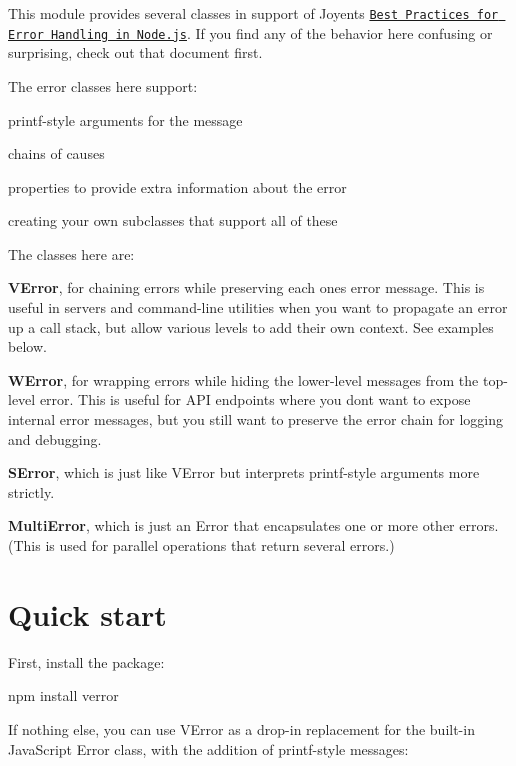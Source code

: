 This module provides several classes in support of Joyent\textquotesingle{}s \href{http://www.joyent.com/developers/node/design/errors}{\tt Best Practices for Error Handling in Node.\+js}. If you find any of the behavior here confusing or surprising, check out that document first.

The error classes here support\+:


\begin{DoxyItemize}
\item printf-\/style arguments for the message
\item chains of causes
\item properties to provide extra information about the error
\item creating your own subclasses that support all of these
\end{DoxyItemize}

The classes here are\+:


\begin{DoxyItemize}
\item {\bfseries V\+Error}, for chaining errors while preserving each one\textquotesingle{}s error message. This is useful in servers and command-\/line utilities when you want to propagate an error up a call stack, but allow various levels to add their own context. See examples below.
\item {\bfseries W\+Error}, for wrapping errors while hiding the lower-\/level messages from the top-\/level error. This is useful for A\+PI endpoints where you don\textquotesingle{}t want to expose internal error messages, but you still want to preserve the error chain for logging and debugging.
\item {\bfseries S\+Error}, which is just like V\+Error but interprets printf-\/style arguments more strictly.
\item {\bfseries Multi\+Error}, which is just an Error that encapsulates one or more other errors. (This is used for parallel operations that return several errors.)
\end{DoxyItemize}

\section*{Quick start}

First, install the package\+: \begin{DoxyVerb}npm install verror
\end{DoxyVerb}


If nothing else, you can use V\+Error as a drop-\/in replacement for the built-\/in Java\+Script Error class, with the addition of printf-\/style messages\+:


